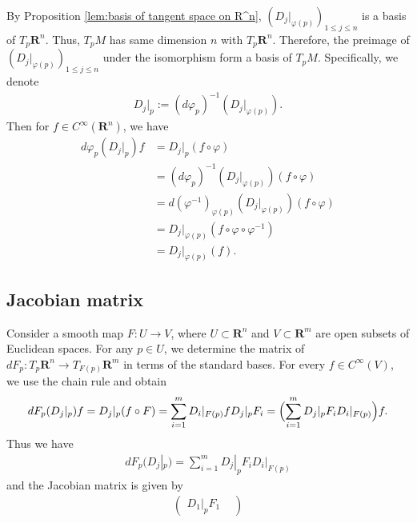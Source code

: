 By Proposition \ref{lem:basis of tangent space on R^n}, $(D_{j}|_{\varphi(p)})_{1 \leq j \leq n}$ is a basis of $T_p\mathbf{R}^n$. Thus, $T_pM$ has same dimension $n$ with $T_p\mathbf{R}^n$. Therefore, the preimage of $(D_{j}|_{\varphi(p)})_{1 \leq j \leq n}$ under the isomorphism form a basis of $T_pM$. Specifically, we denote
    \begin{align*}
        D_{j}|_p := (d\varphi_p)^{-1}(D_{j}|_{\varphi(p)}).
    \end{align*}
Then for $f \in C^\infty(\mathbf{R}^n)$, we have
    \begin{align*}
        d\varphi_{p}(D_{j}|_p)f
        &= D_{j}|_p(f \circ \varphi)\\
        &= (d\varphi_p)^{-1}(D_{j}|_{\varphi(p)})(f \circ \varphi)\\
        &= d(\varphi^{-1})_{\varphi(p)}(D_{j}|_{\varphi(p)})(f \circ \varphi)\\
        &= D_{j}|_{\varphi(p)}(f \circ \varphi \circ \varphi^{-1})\\
        &= D_{j}|_{\varphi(p)}(f).
    \end{align*}

\subsection*{Jacobian matrix}

Consider a smooth map $F : U \to V$, where $U \subset \mathbf{R}^n$ and $V \subset \mathbf{R}^m$ are open subsets of Euclidean spaces. For any $p \in U$, we determine the matrix of $dF_p : T_p\mathbf{R}^n \to T_{F(p)}\mathbf{R}^m$ in terms of the standard bases. For every $f \in C^\infty(V)$, we use the chain rule and obtain
    \begin{align*}
        dF_p(D_j|_p)f
        = D_j|_p(f \circ F)
        = \sum_{i = 1}^{m}D_i|_{F(p)}fD_j|_pF_i
        = \Bigl(\sum_{i = 1}^{m}D_j|_pF_iD_i|_{F(p)}\Bigr)f.
    \end{align*}
Thus we have
    \begin{align*}
        dF_p(D_j|_p) = \sum_{i = 1}^{m}D_j|_pF_iD_i|_{F(p)}
    \end{align*}
and the Jacobian matrix is given by
    \begin{align*}
        \left(\begin{matrix}
            D_1|_pF_1   &   
        \end{matrix}\right)
    \end{align*}

